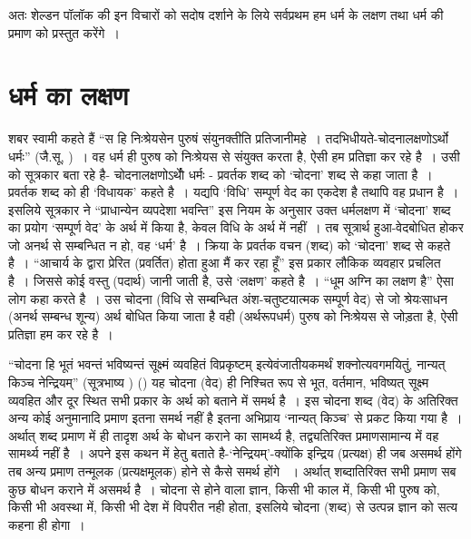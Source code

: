 अतः शेल्डन पॉलॉक की इन विचारों को सदोष दर्शाने के लिये सर्वप्रथम हम धर्म के लक्षण तथा धर्म की प्रमाण को प्रस्तुत करेंगे~।\\[-1cm]



\section*{धर्म का लक्षण}

शबर स्वामी कहते हैं “स हि निःश्रेयसेन पुरुषं संयुनक्तीति प्रतिजानीमहे~। तदभिधीयते-चोदनालक्षणोऽर्थो धर्मः” (जै.सू, )~। वह धर्म ही पुरुष को निःश्रेयस से संयुक्त करता है, ऐसी हम प्रतिज्ञा कर रहे है~। उसी को सूत्रकार बता रहे है- चोदनालक्षणोऽर्थोे धर्मः - प्रवर्तक शब्द को ‘चोदना' शब्द से कहा जाता है~। प्रवर्तक शब्द को ही ‘विधायक' कहते है~। यद्यपि ‘विधि' सम्पूर्ण वेद का एकदेश है तथापि वह प्रधान है~। इसलिये सूत्रकार ने “प्राधान्येन व्यपदेशा भवन्ति” इस नियम के अनुसार उक्त धर्मलक्षण में ‘चोदना' शब्द का प्रयोग ‘सम्पूर्ण वेद' के अर्थ में किया है, केवल विधि के अर्थ में नहीं~। तब सूत्रार्थ हुआ-वेदबोधित होकर जो अनर्थ से सम्बन्धित न हो, वह ‘धर्म' है~। क्रिया के प्रवर्तक वचन (शब्द) को ‘चोदना' शब्द से कहते है~। “आचार्य के द्वारा प्रेरित (प्रवर्तित) होता हुआ मैं कर रहा हूँ” इस प्रकार लौकिक व्यवहार प्रचलित है~। जिससे कोई वस्तु (पदार्थ) जानी जाती है, उसे ‘लक्षण' कहते है~। “धूम अग्नि का लक्षण है” ऐसा लोग कहा करते है~। उस चोदना (विधि से सम्बन्धित अंश-चतुष्टयात्मक सम्पूर्ण वेद) से जो श्रेयःसाधन (अनर्थ सम्बन्ध शून्य) अर्थ बोधित किया जाता है वही (अर्थरूपधर्म) पुरुष को निःश्रेयस से जोड़ता है, ऐसी प्रतिज्ञा हम कर रहे है~।

“चोदना हि भूतं भवन्तं भविष्यन्तं सूक्ष्मं व्यवहितं विप्रकृष्टम् इत्येवंजातीयकमर्थं शक्नोत्य\-वगमयितुं, नान्यत् किञ्च नेन्द्रियम्” (सूत्रभाष्य ) () यह चोदना (वेद) ही निश्चित रूप से भूत, वर्तमान, भविष्यत् सूक्ष्म व्यवहित और दूर स्थित सभी प्रकार के अर्थ को बताने में समर्थ है~। इस चोदना शब्द (वेद) के अतिरिक्त अन्य कोई अनुमानादि प्रमाण इतना समर्थ नहीं है इतना अभिप्राय ‘नान्यत् किञ्च' से प्रकट किया गया है~। अर्थात् शब्द प्रमाण में ही तादृश अर्थ के बोधन कराने का सामर्थ्य है, तद्व्यतिरिक्त प्रमाणसामान्य में वह सामर्थ्य नहीं है~। अपने इस कथन में हेतु बताते है-‘नेन्द्रियम्'-क्योंकि इन्द्रिय (प्रत्यक्ष) ही जब असमर्थ होंगे तब अन्य प्रमाण तन्मूलक (प्रत्यक्षमूलक) होने से कैसे समर्थ होंगे ~। अर्थात् शब्दातिरिक्त सभी प्रमाण सब कुछ बोधन कराने में असमर्थ है~। चोदना से होने वाला ज्ञान, किसी भी काल में, किसी भी पुरुष को, किसी भी अवस्था में, किसी भी देश में विपरीत नही होता, इसलिये चोदना (शब्द) से उत्पन्न ज्ञान को सत्य कहना ही होगा~। 


